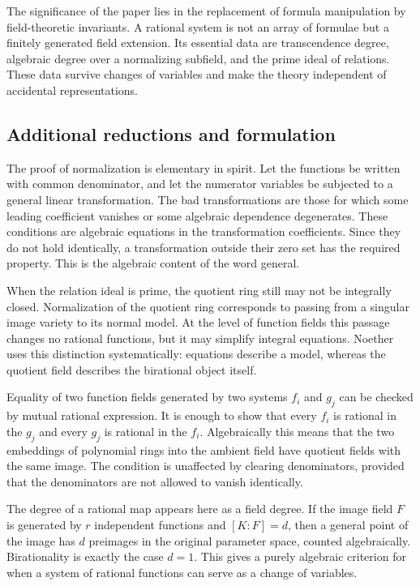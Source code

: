 \documentclass[11pt]{article}
\begin{document}
The significance of the paper lies in the replacement of formula manipulation by field-theoretic
invariants. A rational system is not an array of formulae but a finitely generated field extension.
Its essential data are transcendence degree, algebraic degree over a normalizing subfield, and the
prime ideal of relations. These data survive changes of variables and make the theory independent of
accidental representations.


\subsection{Additional reductions and formulation}

The proof of normalization is elementary in spirit. Let the functions be written with common
denominator, and let the numerator variables be subjected to a general linear transformation. The
bad transformations are those for which some leading coefficient vanishes or some algebraic
dependence degenerates. These conditions are algebraic equations in the transformation coefficients.
Since they do not hold identically, a transformation outside their zero set has the required
property. This is the algebraic content of the word general.

When the relation ideal is prime, the quotient ring still may not be integrally closed.
Normalization of the quotient ring corresponds to passing from a singular image variety to its
normal model. At the level of function fields this passage changes no rational functions, but it may
simplify integral equations. Noether uses this distinction systematically: equations describe a
model, whereas the quotient field describes the birational object itself.

Equality of two function fields generated by two systems \(f_i\) and \(g_j\) can be checked by
mutual rational expression. It is enough to show that every \(f_i\) is rational in the \(g_j\) and
every \(g_j\) is rational in the \(f_i\). Algebraically this means that the two embeddings of
polynomial rings into the ambient field have quotient fields with the same image. The condition is
unaffected by clearing denominators, provided that the denominators are not allowed to vanish
identically.

The degree of a rational map appears here as a field degree. If the image field \(F\) is generated
by \(r\) independent functions and \([K:F]=d\), then a general point of the image has \(d\)
preimages in the original parameter space, counted algebraically. Birationality is exactly the case
\(d=1\). This gives a purely algebraic criterion for when a system of rational functions can serve
as a change of variables.
\end{document}
